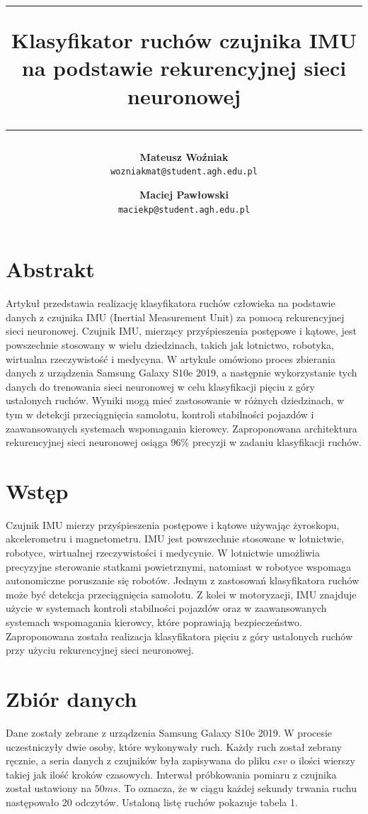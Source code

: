 \documentclass[10pt]{article}
\title{
\rule{\linewidth}{3pt}
Klasyfikator ruchów czujnika IMU na podstawie rekurencyjnej sieci neuronowej
\rule{\linewidth}{1pt}
}
\author{
  \textbf{Mateusz Woźniak}\\
  \texttt{wozniakmat@student.agh.edu.pl}
  \and
  \textbf{Maciej Pawłowski}\\
  \texttt{maciekp@student.agh.edu.pl}
}
\date{}
\begin{document}
\maketitle

\section*{Abstrakt}

Artykuł przedstawia realizację klasyfikatora ruchów człowieka na podstawie danych z czujnika IMU (Inertial Measurement Unit) za pomocą rekurencyjnej sieci neuronowej. Czujnik IMU, mierzący przyśpieszenia postępowe i kątowe, jest powszechnie stosowany w wielu dziedzinach, takich jak lotnictwo, robotyka, wirtualna rzeczywistość i medycyna. W artykule omówiono proces zbierania danych z urządzenia Samsung Galaxy S10e 2019, a następnie wykorzystanie tych danych do trenowania sieci neuronowej w celu klasyfikacji pięciu z góry ustalonych ruchów. Wyniki mogą mieć zastosowanie w różnych dziedzinach, w tym w detekcji przeciągnięcia samolotu, kontroli stabilności pojazdów i zaawansowanych systemach wspomagania kierowcy. Zaproponowana architektura rekurencyjnej sieci neuronowej osiąga 96\% precyzji w zadaniu klasyfikacji ruchów.

\section{Wstęp}

Czujnik IMU mierzy przyśpieszenia postępowe i kątowe używając żyroskopu, akcelerometru i magnetometru. 
IMU jest powszechnie stosowane w lotnictwie, robotyce, wirtualnej rzeczywistości i medycynie. W lotnictwie umożliwia precyzyjne sterowanie statkami powietrznymi, natomiast w robotyce wspomaga autonomiczne poruszanie się robotów. Jednym z zastosowań klasyfikatora ruchów może być detekcja przeciągnięcia samolotu. Z kolei w motoryzacji, IMU znajduje użycie w systemach kontroli stabilności pojazdów oraz w zaawansowanych systemach wspomagania kierowcy, które poprawiają bezpieczeństwo. Zaproponowana została realizacja klasyfikatora pięciu z góry ustalonych ruchów przy użyciu rekurencyjnej sieci neuronowej. 


\section{Zbiór danych}
Dane zostały zebrane z urządzenia Samsung Galaxy S10e 2019. W procesie uczestniczyły dwie osoby, które wykonywały ruch. Każdy ruch został zebrany ręcznie, a seria danych z czujników była zapisywana do pliku $csv$ o ilości wierszy takiej jak ilość kroków czasowych. Interwał próbkowania pomiaru z czujnika został ustawiony na $50ms$. To oznacza, że w ciągu każdej sekundy trwania ruchu następowało 20 odczytów. Ustaloną listę ruchów pokazuje tabela 1. 
\end{document}
